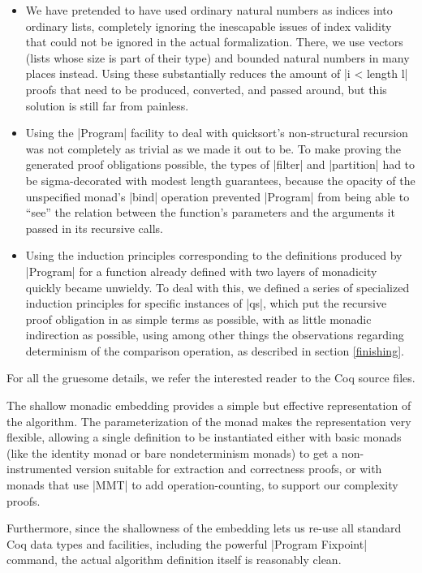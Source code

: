 \documentclass[runningheads]{llncs}
\begin{document}
\begin{itemize}
\item We have pretended to have used ordinary natural numbers as indices into ordinary lists, completely ignoring the inescapable issues of index validity that could not be ignored in the actual formalization. There, we use vectors (lists whose size is part of their type) and bounded natural numbers in many places instead. Using these substantially reduces the amount of |i < length l| proofs that need to be produced, converted, and passed around, but this solution is still far from painless.
\item Using the |Program| facility to deal with quicksort's non-structural recursion was not completely as trivial as we made it out to be. To make proving the generated proof obligations possible, the types of |filter| and |partition| had to be sigma-decorated with modest length guarantees, because the opacity of the unspecified monad's |bind| operation prevented |Program| from being able to ``see'' the relation between the function's parameters and the arguments it passed in its recursive calls.
\item Using the induction principles corresponding to the definitions produced by |Program| for a function already defined with two layers of monadicity quickly became unwieldy. To deal with this, we defined a series of specialized induction principles for specific instances of |qs|, which put the recursive proof obligation in as simple terms as possible, with as little monadic indirection as possible, using among other things the observations regarding determinism of the comparison operation, as described in section \ref{finishing}.
\end{itemize}

For all the gruesome details, we refer the interested reader to the Coq source files.

The shallow monadic embedding provides a simple but effective representation of the algorithm. The parameterization of the monad makes the representation very flexible, allowing a single definition to be instantiated either with basic monads (like the identity monad or bare nondeterminism monads) to get a non-instrumented version suitable for extraction and correctness proofs, or with monads that use |MMT| to add operation-counting, to support our complexity proofs.

Furthermore, since the shallowness of the embedding lets us re-use all standard Coq data types and facilities, including the powerful |Program Fixpoint| command, the actual algorithm definition itself is reasonably clean.
\end{document}
